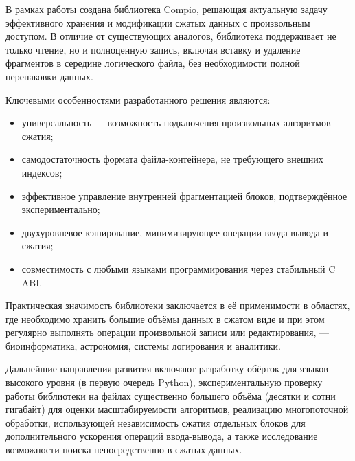  \label{conclusion2}

В рамках работы создана библиотека Compio, решающая актуальную задачу эффективного хранения и модификации сжатых данных с произвольным доступом. В отличие от существующих аналогов, библиотека поддерживает не только чтение, но и полноценную запись, включая вставку и удаление фрагментов в середине логического файла, без необходимости полной перепаковки данных.

Ключевыми особенностями разработанного решения являются:
\begin{itemize}
    \item универсальность — возможность подключения произвольных алгоритмов сжатия;
    \item самодостаточность формата файла-контейнера, не требующего внешних индексов;
    \item эффективное управление внутренней фрагментацией блоков, подтверждённое экспериментально;
    \item двухуровневое кэширование, минимизирующее операции ввода-вывода и сжатия;
    \item совместимость с любыми языками программирования через стабильный C ABI.
\end{itemize}

Практическая значимость библиотеки заключается в её применимости в областях, где необходимо хранить большие объёмы данных в сжатом виде и при этом регулярно выполнять операции произвольной записи или редактирования, — биоинформатика, астрономия, системы логирования и аналитики.

Дальнейшие направления развития включают разработку обёрток для языков высокого уровня (в первую очередь Python), экспериментальную проверку работы библиотеки на файлах существенно большего объёма (десятки и сотни гигабайт) для оценки масштабируемости алгоритмов, реализацию многопоточной обработки, использующей независимость сжатия отдельных блоков для дополнительного ускорения операций ввода-вывода, а также исследование возможности поиска непосредственно в сжатых данных.
